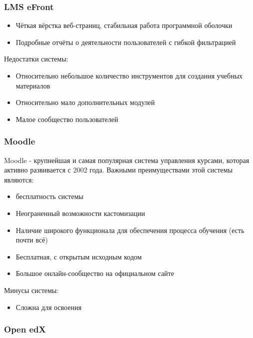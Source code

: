 \documentclass[a4paper,14pt]{article}
\begin{document}
\subsubsection{LMS eFront }

\begin{itemize}
	\item Чёткая вёрстка веб-страниц, стабильная работа программной оболочки 
	\item Подробные отчёты о деятельности пользователей с гибкой фильтрацией	
	
\end{itemize} 

Недостатки системы:

\begin{itemize}
	\item Относительно небольшое количество инструментов для создания учебных материалов
	\item Относительно мало дополнительных модулей
	\item Малое сообщество пользователей
	
	
\end{itemize} 

\subsubsection{Moodle}

Moodle - крупнейшая и самая популярная система управления курсами, которая активно развивается с 2002 года. Важными преимуществами этой системы являются:

\begin{itemize}
	\item бесплатность системы
	\item Неограненный возможности кастомизации
	\item Наличие широкого функционала для обеспечения процесса обучения (есть почти всё)
	\item Бесплатная, с открытым исходным кодом
	\item Большое онлайн-сообщество на официальном сайте
	
\end{itemize} 

Минусы системы:

\begin{itemize}
	\item Сложна для освоения	
\end{itemize} 


\subsubsection{Open edX} 
\end{document}
